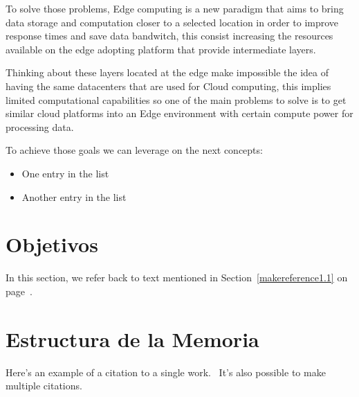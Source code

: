 To solve those problems, Edge computing is a new paradigm that aims to bring data storage and computation closer to a selected location in order to improve response times and save data bandwitch, this consist increasing the resources available on the edge adopting platform that provide intermediate layers.

Thinking about these layers located at the edge make impossible the idea of having the same datacenters that are used for Cloud computing, this implies limited computational capabilities so one of the main problems to solve is to get similar cloud platforms into an Edge environment with certain compute power for processing data. 

To achieve those goals we can leverage on the next concepts:

\begin{itemize}
  \item One entry in the list
  \item Another entry in the list
\end{itemize}



\section{Objetivos}
\label{makereference1.2}

In this section, we refer back to text mentioned in
Section~\ref{makereference1.1} on page~\pageref{makereference1.1}.

\section{Estructura de la Memoria}
\label{makereference1.3}

Here's an example of a citation to a single
work.~\citet{CT:Weiner:1999} It's also possible to make multiple
citations.~\citet{CT:Phillips:1985, ARP:Loy:1974}

